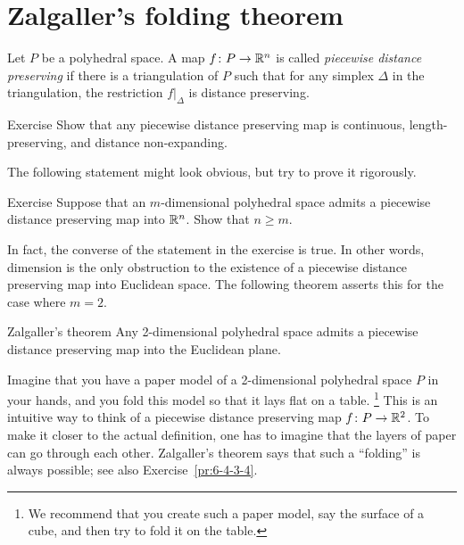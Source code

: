 \section{Zalgaller's folding theorem}

Let $P$ be a polyhedral space.
A map $f\colon P\to\mathbb{R}^n$ is called 
\emph{piecewise distance preserving}
if there is a triangulation of $P$ 
such that for any simplex $\Delta$ in the triangulation, 
the restriction $f|_\Delta$ is distance preserving.

\begin{thm}{Exercise}\label{ex:PDP=>cont}
Show that any piecewise distance preserving map is continuous, length-preserving, and distance non-expanding.
\end{thm}


The following statement might look obvious, 
but try to prove it rigorously. 

\begin{thm}{Exercise}\label{ex:n=<m}
Suppose that an $m$-dimensional polyhedral space admits a piecewise distance preserving map into $\mathbb{R}^n$.
Show that $n\ge m$.
\end{thm}

In fact, the converse of the statement in the exercise is true.  In other words, dimension is the only obstruction to the existence of a piecewise distance preserving map into Euclidean space.
The following theorem asserts this for the case where $m=2$.

\begin{thm}{Zalgaller's theorem}\label{thm:zalgaller}
Any 2-dimensional polyhedral space admits a piecewise distance preserving map into the Euclidean plane.
\end{thm}

Imagine that you have a paper model of a 2-dimensional polyhedral space $P$ in your hands, and you fold this model so that it lays flat on a table.%
\footnote{We recommend that you create such a paper model, say the surface of a cube, and then try to fold it on the table.}
This is an intuitive way to think of a piecewise distance preserving map $f\colon P \to \mathbb{R}^2$.
To make it closer to the actual definition, one has to imagine that the layers of paper can go through each other.
Zalgaller's theorem says that such a ``folding'' is always possible;
see also Exercise~\ref{pr:6-4-3-4}.
  

